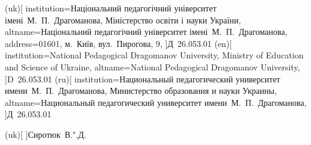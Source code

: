 \documentclass[
]{mon2017dev-aref}[2021/04/12]
\theoremstyle{plain}
\theoremstyle{definition}
\theoremstyle{remark}
\begin{document}

\council(uk)[
  institution={Національний педагогічний університет імені~М.~П.~Драгоманова,
    Міністерство освіти і науки України},
  altname=Національний педагогічний університет імені~М.~П.~Драгоманова,
  address={01601, м.~Київ, вул.~Пирогова, 9},
]{Д~26.053.01}
\council(en)[
  institution={National Pedagogical Dragomanov University,
    Ministry of Education and Science of Ukraine},
  altname=National Pedagogical Dragomanov University,
]{D~26.053.01}
\council(ru)[
  institution={Национальный педагогический университет имени~М.~П.~Драгоманова,
    Министерство образования и науки Украины},
  altname=Национальный педагогический университет имени~М.~П.~Драгоманова,
]{Д~26.053.01}

\secretary(uk)[
]{Сиротюк~В.",Д.}


\end{document}
